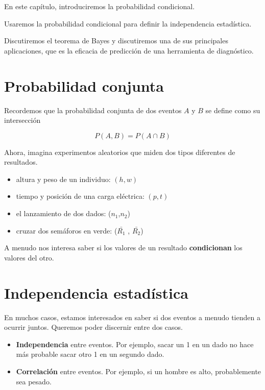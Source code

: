 \documentclass[
]{book}
\begin{document}
En este capítulo, introduciremos la probabilidad condicional.

Usaremos la probabilidad condicional para definir la independencia estadística.

Discutiremos el teorema de Bayes y discutiremos una de sus principales aplicaciones, que es la eficacia de predicción de una herramienta de diagnóstico.

\hypertarget{probabilidad-conjunta}{%
\section{Probabilidad conjunta}\label{probabilidad-conjunta}}

Recordemos que la probabilidad conjunta de dos eventos \(A\) y \(B\) se define como su intersección

\[P( A,B )=P(A \cap B)\]

Ahora, imagina experimentos aleatorios que miden dos tipos diferentes de resultados.

\begin{itemize}
\item
  altura y peso de un individuo: \((h, w)\)
\item
  tiempo y posición de una carga eléctrica: \((p, t)\)
\item
  el lanzamiento de dos dados: (\(n_1\),\(n_2\))
\item
  cruzar dos semáforos en verde: (\(\bar{R_ 1}\) , \(\bar{R_2}\))
\end{itemize}

A menudo nos interesa saber si los valores de un resultado \textbf{condicionan} los valores del otro.

\hypertarget{independencia-estaduxedstica}{%
\section{Independencia estadística}\label{independencia-estaduxedstica}}

En muchos casos, estamos interesados en saber si dos eventos a menudo tienden a ocurrir juntos. Queremos poder discernir entre dos casos.

\begin{itemize}
\item
  \textbf{Independencia} entre eventos. Por ejemplo, sacar un 1 en un dado no hace más probable sacar otro 1 en un segundo dado.
\item
  \textbf{Correlación} entre eventos. Por ejemplo, si un hombre es alto, probablemente sea pesado.
\end{itemize}
\end{document}
